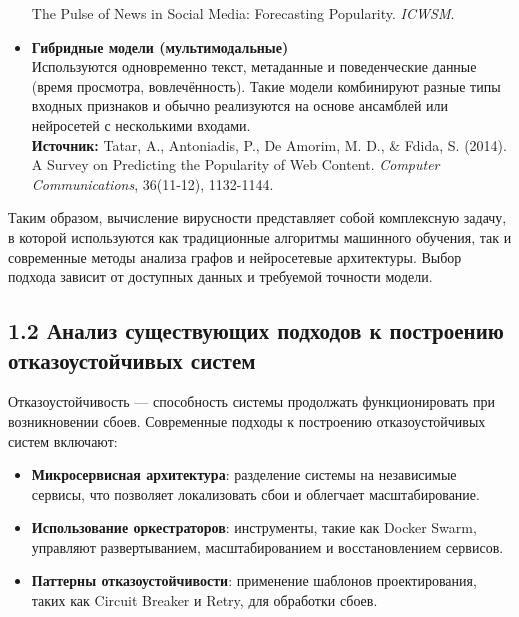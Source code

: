 \begin{itemize}
  The Pulse of News in Social Media: Forecasting Popularity.
  \emph{ICWSM}.
\item
  \textbf{Гибридные модели (мультимодальные)}\\
  Используются одновременно текст, метаданные и поведенческие данные
  (время просмотра, вовлечённость). Такие модели комбинируют разные типы
  входных признаков и обычно реализуются на основе ансамблей или
  нейросетей с несколькими входами.\\
  \textbf{Источник:} Tatar, A., Antoniadis, P., De Amorim, M. D., \&
  Fdida, S. (2014). A Survey on Predicting the Popularity of Web
  Content. \emph{Computer Communications}, 36(11-12), 1132-1144.
\end{itemize}

Таким образом, вычисление вирусности представляет собой комплексную
задачу, в которой используются как традиционные алгоритмы машинного
обучения, так и современные методы анализа графов и нейросетевые
архитектуры. Выбор подхода зависит от доступных данных и требуемой
точности модели.

\hypertarget{ux430ux43dux430ux43bux438ux437-ux441ux443ux449ux435ux441ux442ux432ux443ux44eux449ux438ux445-ux43fux43eux434ux445ux43eux434ux43eux432-ux43a-ux43fux43eux441ux442ux440ux43eux435ux43dux438ux44e-ux43eux442ux43aux430ux437ux43eux443ux441ux442ux43eux439ux447ux438ux432ux44bux445-ux441ux438ux441ux442ux435ux43c}{%
\subsection{\texorpdfstring{\textbf{1.2 Анализ существующих подходов к
построению отказоустойчивых
систем}}{1.2 Анализ существующих подходов к построению отказоустойчивых систем}}\label{ux430ux43dux430ux43bux438ux437-ux441ux443ux449ux435ux441ux442ux432ux443ux44eux449ux438ux445-ux43fux43eux434ux445ux43eux434ux43eux432-ux43a-ux43fux43eux441ux442ux440ux43eux435ux43dux438ux44e-ux43eux442ux43aux430ux437ux43eux443ux441ux442ux43eux439ux447ux438ux432ux44bux445-ux441ux438ux441ux442ux435ux43c}}

Отказоустойчивость --- способность системы продолжать функционировать
при возникновении сбоев. Современные подходы к построению
отказоустойчивых систем включают:

\begin{itemize}
\tightlist
\item
  \textbf{Микросервисная архитектура}: разделение системы на независимые
  сервисы, что позволяет локализовать сбои и облегчает
  масштабирование.\\
\item
  \textbf{Использование оркестраторов}: инструменты, такие как Docker
  Swarm, управляют развертыванием, масштабированием и восстановлением
  сервисов.\\
\item
  \textbf{Паттерны отказоустойчивости}: применение шаблонов
  проектирования, таких как Circuit Breaker и Retry, для обработки
  сбоев.
\end{itemize}

